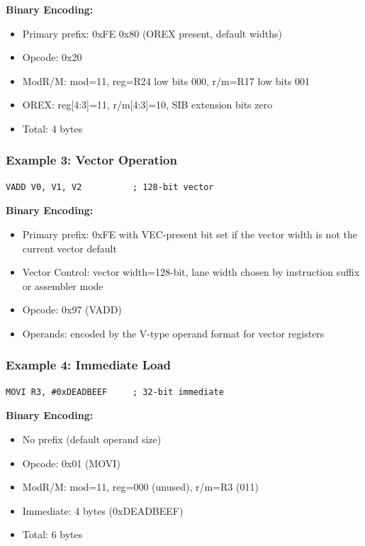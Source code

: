 \documentclass[11pt]{article}
\begin{document}
\textbf{Binary Encoding:}
\begin{itemize}
    \item Primary prefix: 0xFE 0x80 (OREX present, default widths)
    \item Opcode: 0x20
    \item ModR/M: mod=11, reg=R24 low bits 000, r/m=R17 low bits 001
    \item OREX: reg[4:3]=11, r/m[4:3]=10, SIB extension bits zero
    \item Total: 4 bytes
\end{itemize}

\subsubsection{Example 3: Vector Operation}

\begin{lstlisting}
VADD V0, V1, V2          ; 128-bit vector
\end{lstlisting}

\textbf{Binary Encoding:}
\begin{itemize}
    \item Primary prefix: 0xFE with VEC-present bit set if the vector width is not the current vector default
    \item Vector Control: vector width=128-bit, lane width chosen by instruction suffix or assembler mode
    \item Opcode: 0x97 (VADD)
    \item Operands: encoded by the V-type operand format for vector registers
\end{itemize}

\subsubsection{Example 4: Immediate Load}

\begin{lstlisting}
MOVI R3, #0xDEADBEEF     ; 32-bit immediate
\end{lstlisting}

\textbf{Binary Encoding:}
\begin{itemize}
    \item No prefix (default operand size)
    \item Opcode: 0x01 (MOVI)
    \item ModR/M: mod=11, reg=000 (unused), r/m=R3 (011)
    \item Immediate: 4 bytes (0xDEADBEEF)
    \item Total: 6 bytes
\end{itemize}
\end{document}
